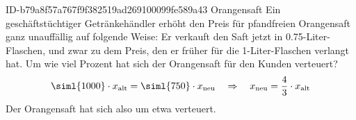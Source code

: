 \begin{exercise}
      {ID-b79a8f57a767f9f382519ad269100099fe589a43}
      {Orangensaft}
  \ifproblem\problem
    Ein geschäftstüchtiger Getränkehändler erhöht den Preis für pfandfreien
    Orangensaft \glqq ganz unauffällig\grqq{} auf folgende Weise: Er verkauft
    den Saft jetzt in \num{0.75}-Liter-Flaschen, und zwar zu dem Preis, den er
    früher für die 1-Liter-Flaschen verlangt hat. Um wie viel Prozent
    hat sich der Orangensaft für den Kunden verteuert?
  \fi
  \ifoutcome\outcome
    \begin{equation*}
      \text{\siml{1000}}\cdot x_{\text{alt}}=\text{\siml{750}}\cdot x_{\text{neu}}
      \quad\Rightarrow\quad
      x_{\text{neu}}=\frac{4}{3}\cdot x_{\text{alt}}
    \end{equation*}
    Der Orangensaft hat sich also um etwa  verteuert.
  \fi
\end{exercise}
